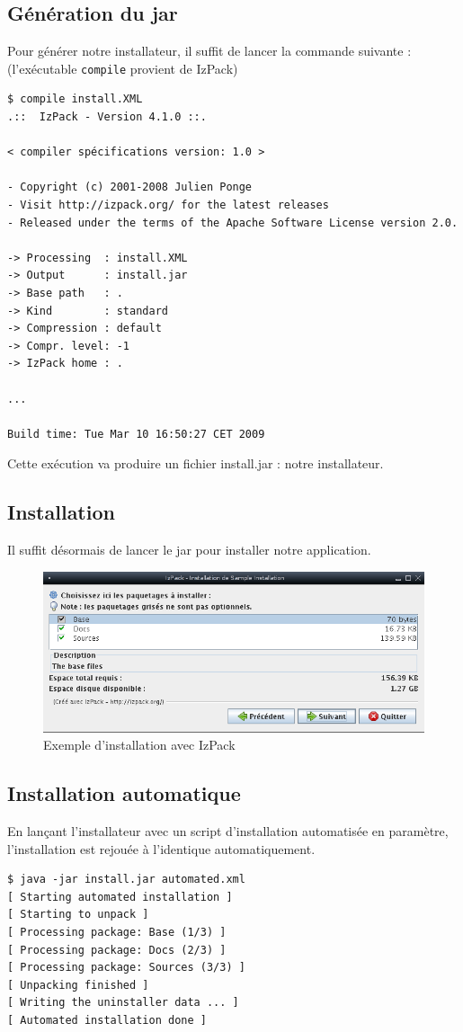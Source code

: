 \subsection{Génération du jar}
Pour générer notre installateur, il suffit de lancer la commande suivante : (l'exécutable \verb|compile| provient de IzPack)
\begin{verbatim}
$ compile install.XML
.::  IzPack - Version 4.1.0 ::.

< compiler spécifications version: 1.0 >

- Copyright (c) 2001-2008 Julien Ponge
- Visit http://izpack.org/ for the latest releases
- Released under the terms of the Apache Software License version 2.0.

-> Processing  : install.XML
-> Output      : install.jar
-> Base path   : .
-> Kind        : standard
-> Compression : default
-> Compr. level: -1
-> IzPack home : .

...

Build time: Tue Mar 10 16:50:27 CET 2009
\end{verbatim}
Cette exécution va produire un fichier install.jar : notre installateur.
\subsection{Installation}
Il suffit désormais de lancer le jar pour installer notre application.
\begin{figure}[H]
	\centering
	\includegraphics[width=15cm]{../image/installSample.png}
	\caption{Exemple d'installation avec IzPack}
\end{figure}
\subsection{Installation automatique}
En lançant l'installateur avec un script d'installation automatisée en paramètre, l'installation est rejouée à l'identique automatiquement.
\begin{verbatim}
$ java -jar install.jar automated.xml
[ Starting automated installation ]
[ Starting to unpack ]
[ Processing package: Base (1/3) ]
[ Processing package: Docs (2/3) ]
[ Processing package: Sources (3/3) ]
[ Unpacking finished ]
[ Writing the uninstaller data ... ]
[ Automated installation done ]
\end{verbatim}

